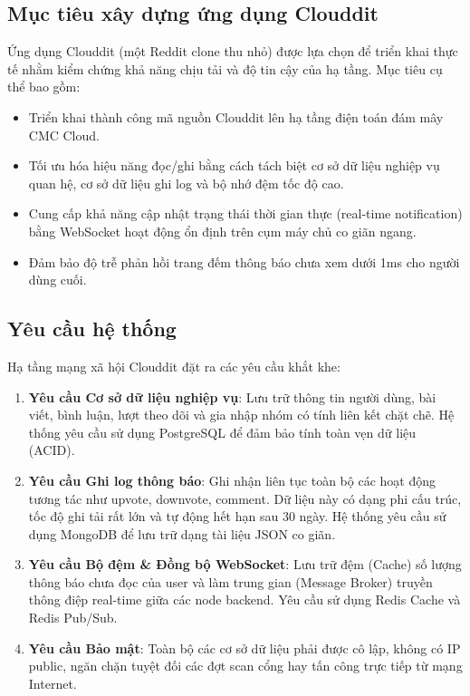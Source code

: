 \documentclass[12pt, a4paper]{article}
\begin{document}
\subsection{Mục tiêu xây dựng ứng dụng Clouddit}
Ứng dụng Clouddit (một Reddit clone thu nhỏ) được lựa chọn để triển khai thực tế nhằm kiểm chứng khả năng chịu tải và độ tin cậy của hạ tầng. Mục tiêu cụ thể bao gồm:
\begin{itemize}
    \item Triển khai thành công mã nguồn Clouddit lên hạ tầng điện toán đám mây CMC Cloud.
    \item Tối ưu hóa hiệu năng đọc/ghi bằng cách tách biệt cơ sở dữ liệu nghiệp vụ quan hệ, cơ sở dữ liệu ghi log và bộ nhớ đệm tốc độ cao.
    \item Cung cấp khả năng cập nhật trạng thái thời gian thực (real-time notification) bằng WebSocket hoạt động ổn định trên cụm máy chủ co giãn ngang.
    \item Đảm bảo độ trễ phản hồi trang đếm thông báo chưa xem dưới 1ms cho người dùng cuối.
\end{itemize}

\subsection{Yêu cầu hệ thống}
Hạ tầng mạng xã hội Clouddit đặt ra các yêu cầu khắt khe:
\begin{enumerate}
    \item \textbf{Yêu cầu Cơ sở dữ liệu nghiệp vụ}: Lưu trữ thông tin người dùng, bài viết, bình luận, lượt theo dõi và gia nhập nhóm có tính liên kết chặt chẽ. Hệ thống yêu cầu sử dụng PostgreSQL để đảm bảo tính toàn vẹn dữ liệu (ACID).
    \item \textbf{Yêu cầu Ghi log thông báo}: Ghi nhận liên tục toàn bộ các hoạt động tương tác như upvote, downvote, comment. Dữ liệu này có dạng phi cấu trúc, tốc độ ghi tải rất lớn và tự động hết hạn sau 30 ngày. Hệ thống yêu cầu sử dụng MongoDB để lưu trữ dạng tài liệu JSON co giãn.
    \item \textbf{Yêu cầu Bộ đệm & Đồng bộ WebSocket}: Lưu trữ đệm (Cache) số lượng thông báo chưa đọc của user và làm trung gian (Message Broker) truyền thông điệp real-time giữa các node backend. Yêu cầu sử dụng Redis Cache và Redis Pub/Sub.
    \item \textbf{Yêu cầu Bảo mật}: Toàn bộ các cơ sở dữ liệu phải được cô lập, không có IP public, ngăn chặn tuyệt đối các đợt scan cổng hay tấn công trực tiếp từ mạng Internet.
\end{enumerate}
\end{document}
